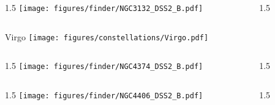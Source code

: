 \documentclass[final]{beamer}
\newlength{\colwidth}
\begin{document}

\begin{frame}[t]{}
  \begin{columns}[T]
    \begin{column}{1.5\colwidth}
      \centering
      \texttt{[image: figures/finder/NGC3132\_DSS2\_B.pdf]}
    \end{column}
    \begin{column}{1.5\colwidth}
      \Large
      
    \end{column}
  \end{columns}
  \vspace{\fill}
\end{frame}


\begin{frame}[t]{\LARGE Virgo}
  \centering
  \texttt{[image: figures/constellations/Virgo.pdf]}
\end{frame}


\begin{frame}[t]{}
  \begin{columns}[T]
    \begin{column}{1.5\colwidth}
      \centering
      \texttt{[image: figures/finder/NGC4374\_DSS2\_B.pdf]}
    \end{column}
    \begin{column}{1.5\colwidth}
      \Large
      
    \end{column}
  \end{columns}
  \vspace{\fill}
  \begin{columns}[T]
    \begin{column}{1.5\colwidth}
      \centering
      \texttt{[image: figures/finder/NGC4406\_DSS2\_B.pdf]}
    \end{column}
    \begin{column}{1.5\colwidth}
      \Large
      
    \end{column}
  \end{columns}
\end{frame}
\end{document}

